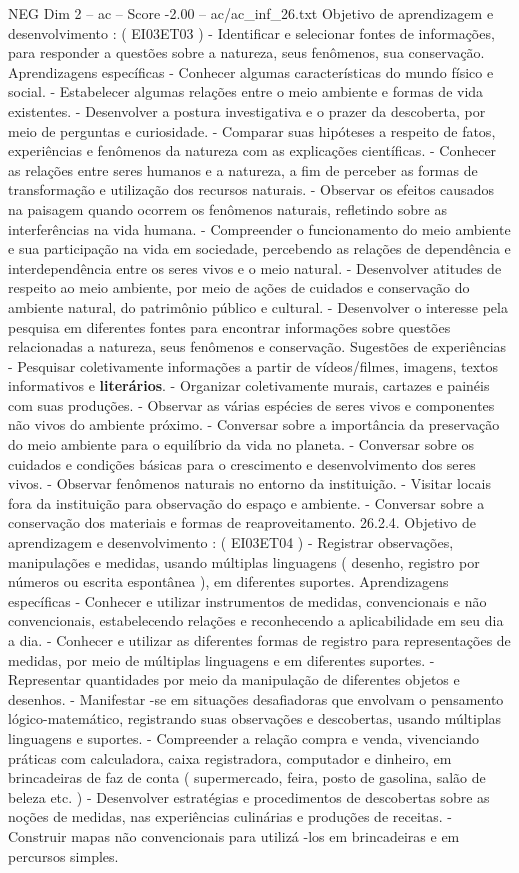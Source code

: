 \begin{textsample}{NEG Dim 2 – ac – Score -2.00 – ac/ac\_inf\_26.txt}
Objetivo de aprendizagem e desenvolvimento : ( EI03ET03 ) - Identificar e selecionar fontes de informações, para responder a questões sobre a natureza, seus fenômenos, sua conservação.
Aprendizagens específicas - Conhecer algumas características do mundo físico e social. - Estabelecer algumas relações entre o meio ambiente e formas de vida existentes. - Desenvolver a postura investigativa e o prazer da descoberta, por meio de perguntas e curiosidade. - Comparar suas hipóteses a respeito de fatos, experiências e fenômenos da natureza com as explicações científicas. - Conhecer as relações entre seres humanos e a natureza, a fim de perceber as formas de transformação e utilização dos recursos naturais. - Observar os efeitos causados na paisagem quando ocorrem os fenômenos naturais, refletindo sobre as interferências na vida humana. - Compreender o funcionamento do meio ambiente e sua participação na vida em sociedade, percebendo as relações de dependência e interdependência entre os seres vivos e o meio natural. - Desenvolver atitudes de respeito ao meio ambiente, por meio de ações de cuidados e conservação do ambiente natural, do patrimônio público e cultural. - Desenvolver o interesse pela pesquisa em diferentes fontes para encontrar informações sobre questões relacionadas a natureza, seus fenômenos e conservação.
Sugestões de experiências - Pesquisar coletivamente informações a partir de vídeos/filmes, imagens, textos informativos e \textbf{literários}. - Organizar coletivamente murais, cartazes e painéis com suas produções. - Observar as várias espécies de seres vivos e componentes não vivos do ambiente próximo. - Conversar sobre a importância da preservação do meio ambiente para o equilíbrio da vida no planeta. - Conversar sobre os cuidados e condições básicas para o crescimento e desenvolvimento dos seres vivos. - Observar fenômenos naturais no entorno da instituição. - Visitar locais fora da instituição para observação do espaço e ambiente. - Conversar sobre a conservação dos materiais e formas de reaproveitamento. 26.2.4.
Objetivo de aprendizagem e desenvolvimento : ( EI03ET04 ) - Registrar observações, manipulações e medidas, usando múltiplas linguagens ( desenho, registro por números ou escrita espontânea ), em diferentes suportes.
Aprendizagens específicas - Conhecer e utilizar instrumentos de medidas, convencionais e não convencionais, estabelecendo relações e reconhecendo a aplicabilidade em seu dia a dia. - Conhecer e utilizar as diferentes formas de registro para representações de medidas, por meio de múltiplas linguagens e em diferentes suportes. - Representar quantidades por meio da manipulação de diferentes objetos e desenhos. - Manifestar -se em situações desafiadoras que envolvam o pensamento lógico-matemático, registrando suas observações e descobertas, usando múltiplas linguagens e suportes. - Compreender a relação compra e venda, vivenciando práticas com calculadora, caixa registradora, computador e dinheiro, em brincadeiras de faz de conta ( supermercado, feira, posto de gasolina, salão de beleza etc. ) - Desenvolver estratégias e procedimentos de descobertas sobre as noções de medidas, nas experiências culinárias e produções de receitas. - Construir mapas não convencionais para utilizá -los em brincadeiras e em percursos simples.

\end{textsample}
